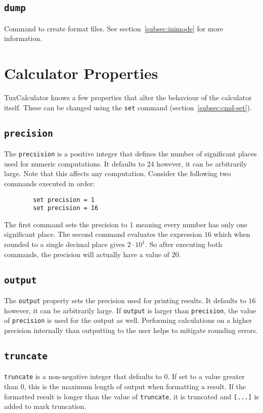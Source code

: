 \documentclass[10pt]{article}
\begin{document}
    \subsection{\texttt{dump}}\label{subsec:cmd-dump}
    Command to create format files.
    See section~\ref{subsec:inimode} for more information.

    \section{Calculator Properties}\label{sec:calculator-properties}
    TuxCalculator knows a few properties that alter the behaviour of the calculator itself.
    These can be changed using the \verb|set| command (section~\ref{subsec:cmd-set}).
    
    \subsection{\texttt{precision}}\label{subsec:precision}
    The \verb|precsision| is a positive integer that defines the number of significant places used for numeric computations.
    It defaults to $ 24 $ however, it can be arbitrarily large.
    Note that this affects any computation.
    Consider the following two commands executed in order:
    \begin{verbatim}
        set precision = 1
        set precision = 16
    \end{verbatim}
    The first command sets the precision to $ 1 $ meaning every number has only one significant place.
    The second command evaluates the expression $ 16 $ which when rounded to a single decimal place gives $ 2 \cdot 10^1 $.
    So after executing both commands, the precision will actually have a value of $ 20 $.
    
    \subsection{\texttt{output}}\label{subsec:output}
    The \verb|output| property sets the precision used for printing results.
    It defaults to $ 16 $ however, it can be arbitrarily large.
    If \verb|output| is larger than \verb|precision|, the value of \verb|precision| is used for the output as well.
    Performing calculations on a higher precision internally than outputting to the user helps to mitigate rounding errors.
    
    \subsection{\texttt{truncate}}\label{subsec:truncate}
    \verb|truncate| is a non-negative integer that defaults to $ 0 $.
    If set to a value greater than $ 0 $, this is the maximum length of output when formatting a result.
    If the formatted result is longer than the value of \verb|truncate|, it is truncated and \verb|[...]| is added to mark truncation.
    
\end{document}
